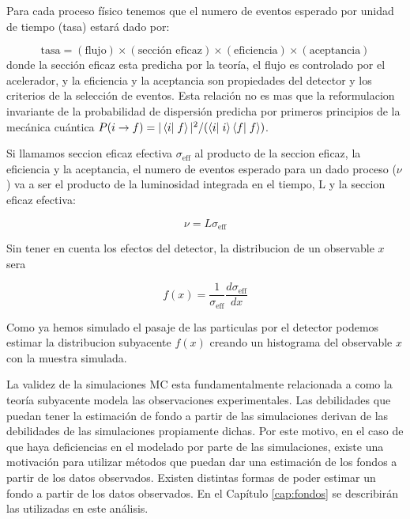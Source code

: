 Para cada proceso físico tenemos que el numero de eventos esperado por unidad de tiempo (tasa)
estará dado por:

\begin{equation}
  \text{tasa} = (\text{flujo}) \times (\text{sección eficaz}) \times (\text{eficiencia}) \times (\text{aceptancia})
\end{equation}
%
donde la sección eficaz esta predicha por la teoría, el flujo es controlado por
el acelerador, y la eficiencia y la aceptancia son propiedades del detector y los
criterios de la selección de eventos. Esta relación no es mas que la reformulacion
invariante de la probabilidad de dispersión predicha por primeros principios de la
mecánica cuántica $P(i\to f) = |\braket{i}{f}|^2/(\braket{i}{i}\braket{f}{f})$.

Si llamamos seccion eficaz efectiva $\sigma_\text{eff}$ al producto de la seccion eficaz,
la eficiencia y la aceptancia, el numero de eventos esperado para un dado proceso ($\nu$)
va a ser el producto de la luminosidad integrada en el tiempo, L y la seccion eficaz efectiva:

\begin{equation}
  \nu = L \sigma_\text{eff}
\end{equation}

Sin tener en cuenta los efectos del detector, la distribucion de un observable $x$ sera

\begin{equation}
 f(x) = \frac{1}{\sigma_\text{eff}} \frac{d\sigma_\text{eff}}{dx}
\end{equation}

Como ya hemos simulado el pasaje de las particulas por el detector podemos estimar
la distribucion subyacente $f(x)$ creando un histograma del observable $x$ con la muestra
simulada.

La validez de la simulaciones MC esta fundamentalmente relacionada a como la teoría
subyacente modela las observaciones experimentales. Las debilidades que puedan tener
la estimación de fondo a partir de las simulaciones derivan de las debilidades
de las simulaciones propiamente dichas. Por este motivo, en el caso de que haya
deficiencias en el modelado por parte de las simulaciones, existe una motivación
para utilizar métodos que puedan dar una estimación de los fondos a partir de los
datos observados. Existen distintas formas de poder estimar un fondo a partir
de los datos observados. En el Capítulo \ref{cap:fondos} se describirán las utilizadas
en este análisis.

